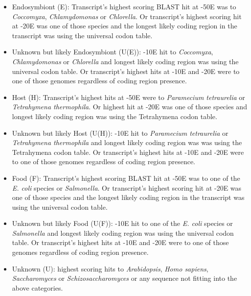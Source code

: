 \begin{itemize}
  \item Endosymbiont (E): Transcript's highest scoring BLAST hit at -50E was to \textit{Coccomyxa}, \textit{Chlamydomonas} or \textit{Chlorella}.  Or transcript's highest scoring hit at -20E was one of those species and the longest likely coding region in the transcript was using the universal codon table. 
  \item Unknown but likely Endosymbiont (U(E)): -10E hit to \textit{Coccomyxa}, \textit{Chlamydomonas} or \textit{Chlorella} and longest likely coding region was using the universal codon table. Or transcript's highest hits at -10E and -20E were to one of those genomes regardless of coding region presence.
  \item Host (H): Transcript's highest hits at -50E were to \textit{Paramecium tetraurelia} or \textit{Tetrahymena thermophila}.  Or highest hit at -20E was one of those species and longest likely coding region was using the Tetrahymena codon table.
  \item Unknown but likely Host (U(H)): -10E hit to \textit{Paramecium tetraurelia} or \textit{Tetrahymena thermophila} and longest likely coding region was was using the Tetrahymena codon table. Or transcript's highest hits at -10E and -20E were to one of those genomes regardless of coding region presence.
  \item Food (F): Transcript's highest scoring BLAST hit at -50E was to one of the \textit{E. coli} species or \textit{Salmonella}.  Or transcript's highest scoring hit at -20E was one of those species and the longest likely coding region in the transcript was using the universal codon table.
  \item Unknown but likely Food (U(F)): -10E hit to one of the \textit{E. coli} species or \textit{Salmonella} and longest likely coding region was using the universal codon table. Or transcript's highest hits at -10E and -20E were to one of those genomes regardless of coding region presence.
  \item Unknown (U): highest scoring hits to \textit{Arabidopsis}, \textit{Homo sapiens}, \textit{Saccharomyces} or \textit{Schizosaccharomyces} or any sequence not fitting into the above categories.
\end{itemize}

